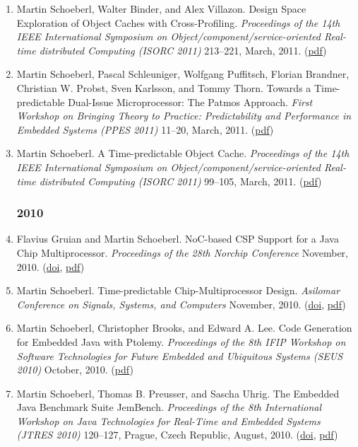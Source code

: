 \begin{enumerate}
\item Martin Schoeberl, Walter Binder, and Alex Villazon.
 Design Space Exploration of Object Caches with Cross-Profiling.
 \emph{Proceedings of the 14th IEEE International Symposium on Object/component/service-oriented Real-time distributed Computing (ISORC 2011)} 213--221, March, 2011.
(\href{http://www.jopdesign.com/doc/profocache.pdf}{pdf})

\item Martin Schoeberl, Pascal Schleuniger, Wolfgang Puffitsch, Florian Brandner, Christian W. Probst, Sven Karlsson, and Tommy Thorn.
 Towards a Time-predictable Dual-Issue Microprocessor: The Patmos Approach.
 \emph{First Workshop on Bringing Theory to Practice: Predictability and Performance in Embedded Systems (PPES 2011)} 11--20, March, 2011.
(\href{http://www.jopdesign.com/doc/patmos_ppes.pdf}{pdf})

\item Martin Schoeberl.
 A Time-predictable Object Cache.
 \emph{Proceedings of the 14th IEEE International Symposium on Object/component/service-oriented Real-time distributed Computing (ISORC 2011)} 99--105, March, 2011.
(\href{http://www.jopdesign.com/doc/ocache.pdf}{pdf})


\subsubsection*{2010}

\item Flavius Gruian and Martin Schoeberl.
 NoC-based CSP Support for a Java Chip Multiprocessor.
 \emph{Proceedings of the 28th Norchip Conference} November, 2010.
(\href{http://dx.doi.org/10.1109/NORCHIP.2010.5669484}{doi}, \href{http://www.jopdesign.com/doc/csp_on_jop.pdf}{pdf})

\item Martin Schoeberl.
 Time-predictable Chip-Multiprocessor Design.
 \emph{Asilomar Conference on Signals, Systems, and Computers} November, 2010.
(\href{http://dx.doi.org/10.1109/ACSSC.2010.5757923}{doi}, \href{http://www.jopdesign.com/doc/tpcmp.pdf}{pdf})

\item Martin Schoeberl, Christopher Brooks, and Edward A. Lee.
 Code Generation for Embedded Java with Ptolemy.
 \emph{Proceedings of the 8th IFIP Workshop on Software Technologies for Future Embedded and Ubiquitous Systems (SEUS 2010)} October, 2010.
(\href{http://www.jopdesign.com/doc/codegen.pdf}{pdf})

\item Martin Schoeberl, Thomas B. Preusser, and Sascha Uhrig.
 The Embedded Java Benchmark Suite JemBench.
 \emph{Proceedings of the 8th International Workshop on Java Technologies for Real-Time and Embedded Systems (JTRES 2010)} 120--127, Prague, Czech Republic, August, 2010.
(\href{http://dx.doi.org/10.1145/1850771.1850789}{doi}, \href{http://www.jopdesign.com/doc/jembench.pdf}{pdf})


\end{enumerate}
